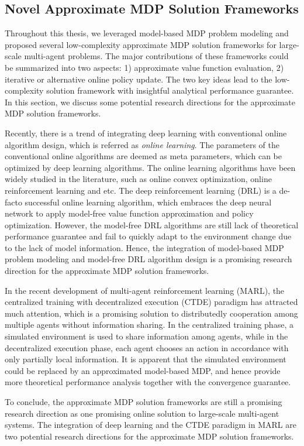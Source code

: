 \subsection{Novel Approximate MDP Solution Frameworks}
Throughout this thesis, we leveraged model-based MDP problem modeling and proposed several low-complexity approximate MDP solution frameworks for large-scale multi-agent problems.
The major contributions of these frameworks could be summarized into two aspects:
1) approximate value function evaluation, 2) iterative or alternative online policy update.
The two key ideas lead to the low-complexity solution framework with insightful analytical performance guarantee.
In this section, we discuss some potential research directions for the approximate MDP solution frameworks.

Recently, there is a trend of integrating deep learning with conventional online algorithm design, which is referred as \emph{online learning}.
The parameters of the conventional online algorithms are deemed as meta parameters, which can be optimized by deep learning algorithms.
The online learning algorithms have been widely studied in the literature, such as online convex optimization, online reinforcement learning and etc.
The deep reinforcement learning (DRL) is a de-facto successful online learning algorithm, which embraces the deep neural network to apply model-free value function approximation and policy optimization.
However, the model-free DRL algorithms are still lack of theoretical performance guarantee and fail to quickly adapt to the environment change due to the lack of model information.
Hence, the integration of model-based MDP problem modeling and model-free DRL algorithm design is a promising research direction for the approximate MDP solution frameworks.

In the recent development of multi-agent reinforcement learning (MARL), the centralized training with decentralized execution (CTDE) paradigm has attracted much attention, which is a promising solution to distributedly cooperation among multiple agents without information sharing.
In the centralized training phase, a simulated environment is used to share information among agents, while in the decentralized execution phase, each agent chooses an action in accordance with only partially local information.
It is apparent that the simulated environment could be replaced by an approximated model-based MDP, and hence provide more theoretical performance analysis together with the convergence guarantee.

To conclude, the approximate MDP solution frameworks are still a promising research direction as one promising online solution to large-scale multi-agent systems.
The integration of deep learning and the CTDE paradigm in MARL are two potential research directions for the approximate MDP solution frameworks.
